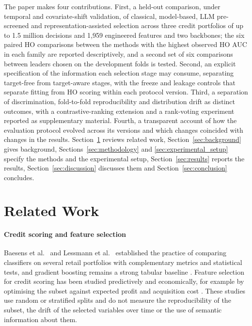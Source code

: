 \documentclass[final,5p,twocolumn]{elsarticle}
\begin{document}
The paper makes four contributions. First, a held-out comparison, under temporal and covariate-shift validation, of classical, model-based, LLM pre-screened and representation-assisted selection across three credit portfolios of up to 1.5 million decisions and 1,959 engineered features and two backbones; the six paired HO comparisons between the methods with the highest observed HO AUC in each family are reported descriptively, and a second set of six comparisons between leaders chosen on the development folds is tested. Second, an explicit specification of the information each selection stage may consume, separating target-free from target-aware stages, with the freeze and leakage controls that separate fitting from HO scoring within each protocol version. Third, a separation of discrimination, fold-to-fold reproducibility and distribution drift as distinct outcomes, with a contrastive-ranking extension and a rank-voting experiment reported as supplementary material. Fourth, a transparent account of how the evaluation protocol evolved across its versions and which changes coincided with changes in the results. Section~\ref{sec:related_work} reviews related work, Section~\ref{sec:background} gives background, Sections~\ref{sec:methodology} and \ref{sec:experimental_setup} specify the methods and the experimental setup, Section~\ref{sec:results} reports the results, Section~\ref{sec:discussion} discusses them and Section~\ref{sec:conclusion} concludes.


\section{Related Work}
\label{sec:related_work}

\paragraph{Credit scoring and feature selection}
Baesens et al.\ \cite{baesens2003} and Lessmann et al.\ \cite{lessmann2015} established the practice of comparing classifiers on several retail portfolios with complementary metrics and statistical tests, and gradient boosting remains a strong tabular baseline \cite{gunnarsson2021}. Feature selection for credit scoring has been studied predictively and economically, for example by optimising the subset against expected profit and acquisition cost \cite{maldonado2017}. These studies use random or stratified splits and do not measure the reproducibility of the subset, the drift of the selected variables over time or the use of semantic information about them.
\end{document}
